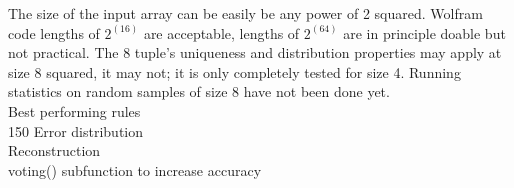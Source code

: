 \documentclass[11pt]{article}
\begin{document}
The size of the input array can be easily be any power of 2 squared. Wolfram code lengths of $2^(16)$ are acceptable, lengths of $2^(64)$ are in principle doable but not practical. The 8 tuple's uniqueness and distribution properties may apply at size 8 squared, it may not; it is only completely tested for size 4. Running statistics on random samples of size 8 have not been done yet.\\

Best performing rules\\

150 Error distribution\\

Reconstruction\\

voting() subfunction to increase accuracy\\





\end{document}
